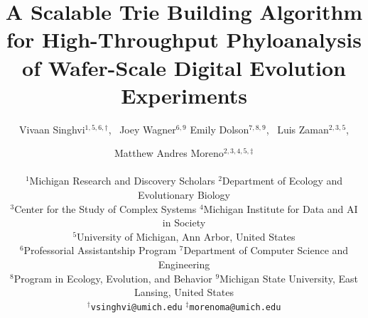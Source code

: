 \title{A Scalable Trie Building Algorithm for High-Throughput Phyloanalysis of Wafer-Scale Digital Evolution Experiments}

\author{
    Vivaan Singhvi$^{1,5,6,\dagger}$,\ %
    Joey Wagner$^{6,9}$
    Emily Dolson$^{7,8,9}$,\ %
    Luis Zaman$^{2,3,5}$, \and
    Matthew Andres Moreno$^{2,3,4,5,\ddagger}$ \\
    \mbox{}\\
    $^1$Michigan Research and Discovery Scholars
    $^2$Department of Ecology and Evolutionary Biology \\
    $^3$Center for the Study of Complex Systems
    $^4$Michigan Institute for Data and AI in Society \\
    $^5$University of Michigan, Ann Arbor, United States \\
    $^6$Professorial Assistantship Program
    $^7$Department of Computer Science and Engineering \\
    $^8$Program in Ecology, Evolution, and Behavior
    $^9$Michigan State University, East Lansing, United States \\
    $^\dagger$\texttt{vsinghvi@umich.edu} $^\ddagger$\texttt{morenoma@umich.edu}
}

\maketitle
